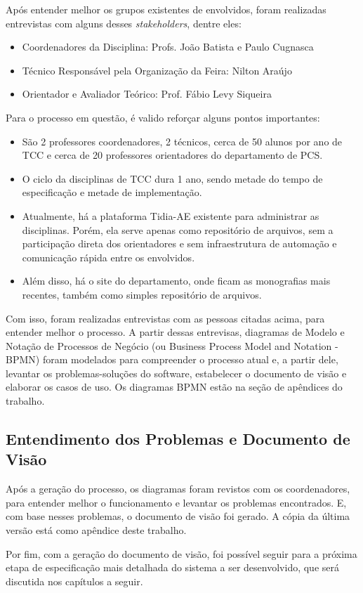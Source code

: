 Após entender melhor os grupos existentes de envolvidos, foram realizadas entrevistas com alguns desses \textit{stakeholders}, dentre eles:

\begin{itemize}
    \item Coordenadores da Disciplina: Profs. João Batista e Paulo Cugnasca
    \item Técnico Responsável pela Organização da Feira: Nilton Araújo
    \item Orientador e Avaliador Teórico: Prof. Fábio Levy Siqueira
\end{itemize}

Para o processo em questão, é valido reforçar alguns pontos importantes:

\begin{itemize}
    \item São 2 professores coordenadores, 2 técnicos, cerca de 50 alunos por ano de TCC e cerca de 20 professores orientadores do departamento de PCS.
    \item O ciclo da disciplinas de TCC dura 1 ano, sendo metade do tempo de especificação e metade de implementação.
    \item Atualmente, há a plataforma Tidia-AE existente para administrar as disciplinas. Porém, ela serve apenas como repositório de arquivos, sem a participação direta dos orientadores e sem infraestrutura de automação e comunicação rápida entre os envolvidos.
    \item Além disso, há o site do departamento, onde ficam as monografias mais recentes, também como simples repositório de arquivos.
\end{itemize}

Com isso, foram realizadas entrevistas com as pessoas citadas acima, para entender melhor o processo. A partir dessas entrevisas, diagramas de Modelo e Notação de Processos de Negócio (ou Business Process Model and Notation - BPMN) foram modelados para compreender o processo atual e, a partir dele, levantar os problemas-soluções do software, estabelecer o documento de visão e elaborar os casos de uso. Os diagramas BPMN estão na seção de apêndices do trabalho.

\subsection{Entendimento dos Problemas e Documento de Visão}

Após a geração do processo, os diagramas foram revistos com os coordenadores, para entender melhor o funcionamento e levantar os problemas encontrados. E, com base nesses problemas, o documento de visão foi gerado. A cópia da última versão está como apêndice deste trabalho.

Por fim, com a geração do documento de visão, foi possível seguir para a próxima etapa de especificação mais detalhada do sistema a ser desenvolvido, que será discutida nos capítulos a seguir.

